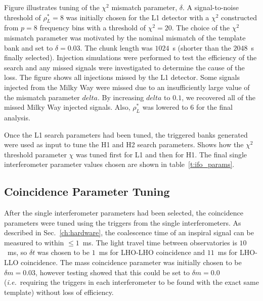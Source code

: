 Figure illustrates tuning of the $\chi^2$ mismatch parameter,
$\delta$. A signal-to-noise threshold of $\rho^\ast_L = 8$ was initially chosen
for the L1 detector with a $\chi^2$ constructed from $p = 8$ frequency bins
with a threshold of $\chi^2 = 20$. The choice of the $\chi^2$ mismatch
parameter was motivated by the nominal mismatch of the template bank and set to
$\delta = 0.03$. The chunk length was $1024$~s
(shorter than the $2048$~s finally selected). Injection simulations were
performed to test the efficiency of the search and any missed signals were
investigated to determine the cause of the loss. The figure shows all
injections missed by the L1 detector. Some signals injected from the Milky Way
were missed due to an insufficiently large value of the mismatch
parameter $delta$. By increasing $delta$ to $0.1$, we recovered all of
the missed Milky Way injected
signals.  Also, $\rho^\ast_L$ was lowered to 6 for the final analysis.

Once the L1 search parameters had been tuned, the triggered banks generated
were used as input to tune the H1 and H2 search parameters.
Shows how the $\chi^2$ threshold parameter
$\chi$ was tuned first for L1 and then for H1. The final single
interferometer parameter values chosen are shown in
table~\ref{t:ifo_params}.

\subsection{Coincidence Parameter Tuning}
\label{ss:coinc_tuning}

After the single interferometer parameters had been selected, the coincidence
parameters were tuned using the triggers from the single interferometers.
As described in Sec.~\ref{ch:hardware}, the coalescence time of
an inspiral signal can be measured to within $\le1$~ms. The light travel time
between observatories is $10$~ms, so $\delta t$ was chosen to be $1$~ms for
LHO-LHO coincidence and $11$~ms for LHO-LLO coincidence. The mass coincidence
parameter was initially chosen to be $\delta m = 0.03$, however testing showed
that this could be set to $\delta m = 0.0$ ({\it i.e.}\ requiring the
triggers in each interferometer to be found with the exact same
template) without loss of efficiency.

